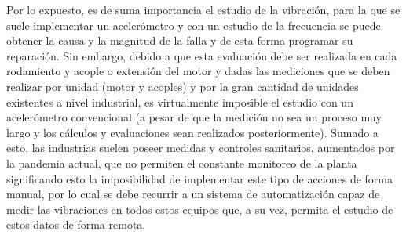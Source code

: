 	Por lo expuesto, es de suma importancia el estudio de la vibración, para la que se suele implementar un acelerómetro y con un estudio de la frecuencia se puede obtener la causa y la magnitud de la falla y de esta forma programar su reparación. Sin embargo, debido a que esta evaluación debe ser realizada en cada rodamiento y acople o extensión del motor  y dadas las mediciones que se deben realizar por unidad (motor y acoples) y por la gran cantidad de unidades existentes a nivel industrial, es virtualmente imposible el estudio con un acelerómetro convencional (a pesar de que la medición no sea un proceso muy largo y los cálculos y evaluaciones sean realizados posteriormente). Sumado a esto, las industrias suelen poseer medidas y controles sanitarios, aumentados por la pandemia actual, que no permiten el constante monitoreo de la planta significando esto la imposibilidad de implementar este tipo de acciones de forma manual, por lo cual se debe recurrir a un sistema de automatización capaz de medir las vibraciones en todos estos equipos que, a su vez, permita el estudio de estos datos de forma remota. \\

	

